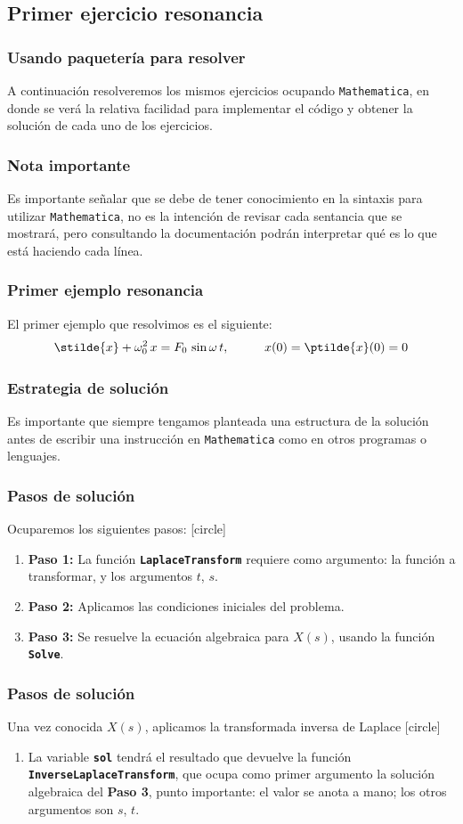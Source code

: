\subsection{Primer ejercicio resonancia}
\begin{frame}
\frametitle{Usando paquetería para resolver}
A continuación resolveremos los mismos ejercicios ocupando \texttt{Mathematica}, en donde se verá la relativa facilidad para implementar el código y obtener la solución de cada uno de los ejercicios.
\end{frame}
\begin{frame}
\frametitle{Nota importante}
Es importante señalar que se debe de tener conocimiento en la sintaxis para utilizar \texttt{Mathematica}, no es la intención de revisar cada sentancia que se mostrará, pero consultando la documentación podrán interpretar qué es lo que está haciendo cada línea.
\end{frame}
\begin{frame}
\frametitle{Primer ejemplo resonancia}
El primer ejemplo que resolvimos es el siguiente:
\begin{align*}
\stilde{x} + \omega_{0}^{2} \, x = F_{0} \, \sin \omega \, t, \hspace{1cm} x(0) = \ptilde{x} (0) = 0
\end{align*}
\end{frame}
\begin{frame}
\frametitle{Estrategia de solución}
Es importante que siempre tengamos planteada una estructura de la solución antes de escribir una instrucción en \texttt{Mathematica} como en otros programas o lenguajes.
\end{frame}
\begin{frame}
\frametitle{Pasos de solución}
Ocuparemos los siguientes pasos:
[circle]
\begin{enumerate}[<+->]
\item \textbf{Paso 1: } La función \texttt{\textbf{LaplaceTransform}} requiere como argumento: la función a transformar, y los argumentos $t$, $s$.
\item \textbf{Paso 2: } Aplicamos las condiciones iniciales del problema.
\item \textbf{Paso 3: } Se resuelve la ecuación algebraica para $X(s)$, usando la función \texttt{\textbf{Solve}}.
\seti
\end{enumerate}
\end{frame}
\begin{frame}
\frametitle{Pasos de solución}
Una vez conocida $X(s)$, aplicamos la transformada inversa de Laplace
[circle]
\begin{enumerate}[<+->]
\conti
\item La variable \texttt{\textbf{sol}} tendrá el resultado que devuelve la función \texttt{\textbf{InverseLaplaceTransform}}, que ocupa como primer argumento la solución algebraica del \textbf{Paso 3}, punto importante: el valor se anota a mano; los otros argumentos son $s$, $t$.
\seti
\end{enumerate}
\end{frame}
